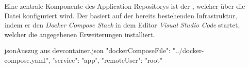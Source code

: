 Eine zentrale Komponente des Application Repositorys ist der , welcher über die  Datei konfiguriert wird. Der  basiert auf der bereits bestehenden Infrastruktur, indem er den \textit{Docker Compose Stack} in dem Editor \textit{Visual Studio Code} startet, welcher die angegebenen Erweiterungen installiert.

\begin{codebox}{json}{Auszug aus devcontainer.json}
{
    "dockerComposeFile": "../docker-compose.yaml",
    "service": "app",
    "remoteUser": "root"
}
\end{codebox}
